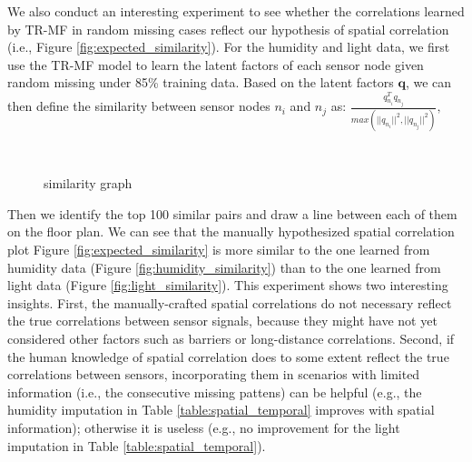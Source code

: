 We also conduct an interesting experiment to see whether the correlations learned by TR-MF in random missing cases reflect our hypothesis of spatial correlation (i.e., Figure \ref{fig:expected_similarity}).
For the humidity and light data, we first use the TR-MF model to learn the latent factors of each sensor node given random missing under 85\% training data.
Based on the latent factors $\mathbf{q}$, we can then define the similarity between sensor nodes $n_i$ and $n_j$ as:
$\frac{q_{n_i}^T q_{n_j}}{max(||q_{n_i}||^2, ||q_{n_j}||^2)},$
\begin{figure}[ftbp]
\centering
{}\\
\hspace{0in}
\vspace{-0.1in}
\caption{similarity graph}
\label{fig:similarity}
\end{figure}

Then we identify the top 100 similar pairs and draw a line between each of them on the floor plan.
We can see that the manually hypothesized spatial correlation plot Figure \ref{fig:expected_similarity} is more similar to the one learned from humidity data (Figure \ref{fig:humidity_similarity}) than to the one learned from light data (Figure \ref{fig:light_similarity}).
This experiment shows two interesting insights.
First, the manually-crafted spatial correlations do not necessary reflect the true correlations between sensor signals, because they might have not yet considered other factors such as barriers or long-distance correlations. 
Second, if the human knowledge of spatial correlation does to some extent reflect the true correlations between sensors, incorporating them in scenarios with limited information (i.e., the consecutive missing pattens) can be helpful (e.g., the humidity imputation in Table \ref{table:spatial_temporal} improves with spatial information); otherwise it is useless (e.g., no improvement for the light imputation in Table \ref{table:spatial_temporal}).
